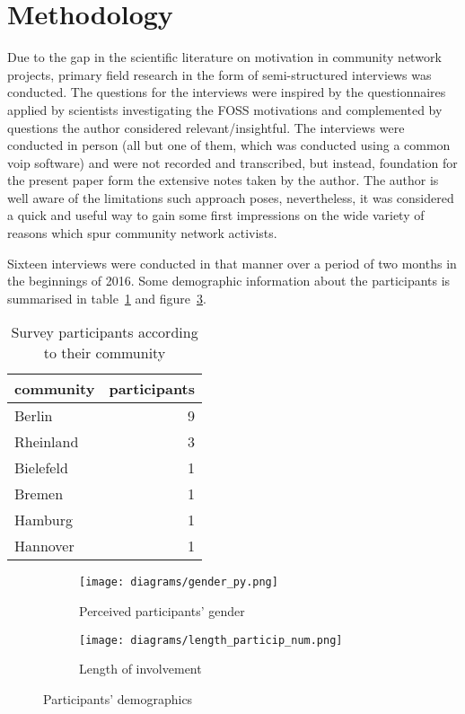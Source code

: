 \section{Methodology}

Due to the gap in the scientific literature on motivation in community network projects, primary field research in the form of semi-structured interviews was conducted.
The questions for the interviews were inspired by the questionnaires applied by scientists investigating the FOSS motivations\cite{HarOu2002}\cite{LakWo2005} and complemented by questions the author considered relevant/insightful. %
The interviews were conducted in person (all but one of them, which was conducted using a common voip software) and were not recorded and transcribed, but instead, foundation for the present paper form the extensive notes taken by the author. %
The author is well aware of the limitations such approach poses, nevertheless, it was considered a quick and useful way to gain some first impressions on the wide variety of reasons which spur community network activists.

Sixteen interviews were conducted in that manner over a period of two months in the beginnings of 2016.
Some demographic information about the participants is summarised in table~\ref{tab:communities} and figure~\ref{fig:demography}.

\begin{table}[h]
  \begin{tabular}{| l | r |}
    \hline
    \textbf{community} & \textbf{participants}\\
    \hline
    Berlin & 9 \\
    \hline
    Rheinland & 3 \\
    \hline
    Bielefeld & 1 \\
    \hline
    Bremen & 1 \\
    \hline
    Hamburg & 1 \\
    \hline
    Hannover & 1 \\
    \hline
  \end{tabular}
\caption{Survey participants according to their community}
\label{tab:communities}
\end{table}


\begin{figure}[h]
  \begin{subfigure}[h]{0.5\textwidth}
    \centering
    \texttt{[image: diagrams/gender\_py.png]}
    \caption{Perceived participants' gender}
    \label{fig:gender}
  \end{subfigure}
  \qquad
  \begin{subfigure}[h]{0.5\textwidth}
    \centering
    \texttt{[image: diagrams/length\_particip\_num.png]}
    \caption{Length of involvement}
    \label{fig:length}
  \end{subfigure}
  \caption{Participants' demographics}
  \label{fig:demography}
\end{figure}

